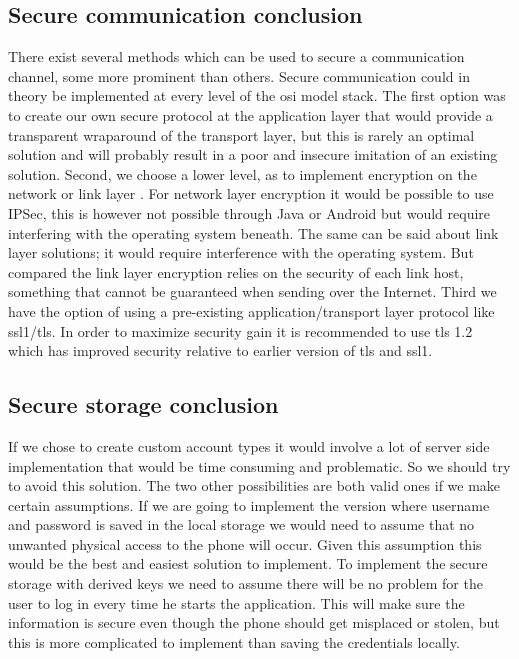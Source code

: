 \subsection{Secure communication conclusion}
There exist several methods which can be used to secure a communication channel, some more prominent than others. Secure communication could in theory be implemented at every level of the \gls{osi} model stack. The first option was to create our own secure protocol at the application layer that would provide a transparent wraparound of the transport layer, but this is rarely an optimal solution and will probably result in a poor and insecure imitation of an existing solution.
\newline
\newline
Second, we choose a lower level, as to implement encryption on the network or link layer \cite{bib:techtarget}. For network layer encryption it would be possible to use IPSec, this is however not possible through Java or Android \cite{bib:ispec} but would require interfering with the operating system beneath.  The same can be said about link layer solutions; it would require interference with the operating system. But compared the link layer encryption relies on the security of each link host, something that cannot be guaranteed when sending over the Internet.
\newline
\newline
Third we have the option of using a pre-existing application/transport layer protocol like \gls{ssl1}/\gls{tls}. In order to maximize security gain it is recommended to use \gls{tls} 1.2 \cite{bib:ssl}  which has improved security relative to earlier version of \gls{tls} and \gls{ssl1}.

\subsection{Secure storage conclusion}
If we chose to create custom account types it would involve a lot of server side implementation that would be time consuming and problematic. So we should try to avoid this solution. The two other possibilities are both valid ones if we make certain assumptions.
\newline
\newline
If we are going to implement the version where username and password is saved in the local storage we would need to assume that no unwanted physical access to the phone will occur. Given this assumption this would be the best and easiest solution to implement.
\newline
\newline
To implement the secure storage with derived keys we need to assume there will be no problem for the user to log in every time he starts the application. This will make sure the information is secure even though the phone should get misplaced or stolen, but this is more complicated to implement than saving the credentials locally.